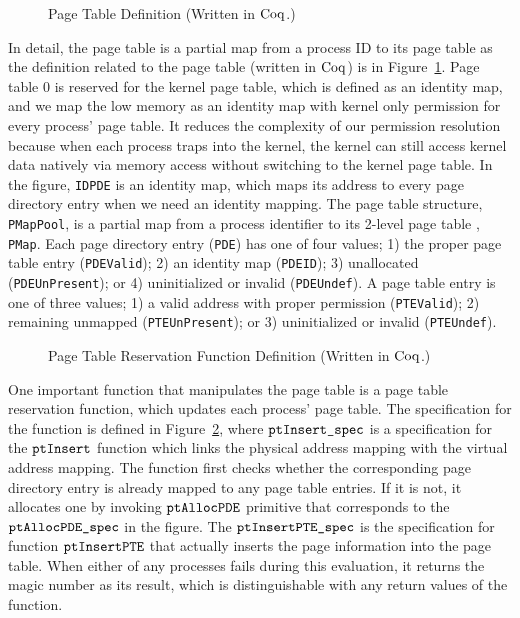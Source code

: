 \begin{figure}
 
\caption{Page Table Definition (Written in $\mathrm{Coq}$.)}
\label{fig:chapter:certikos:page-table}
\end{figure}
In detail, the page table is a partial map from a process ID to its page table as the definition related to the page table (written in $\mathrm{Coq}$) is in
Figure~\ref{fig:chapter:certikos:page-table}. 
Page table 0 is reserved for the kernel page table, which is defined as an identity map,
and we map the low memory as an identity map with kernel only permission
for every process' page table.
It reduces the complexity of our permission resolution because when each process traps into the kernel,
the kernel can still access kernel data natively via memory access
without switching to the kernel page table. 
In the figure, 
\lstinline$IDPDE$ is an identity  map, which maps its address to every page directory entry when we need an identity mapping.
The page table structure, \lstinline$PMapPool$, is a partial map from a process identifier to its 2-level page table , \lstinline$PMap$.
 Each page directory entry (\lstinline$PDE$) has one of four values;
 1) the proper page table entry (\lstinline$PDEValid$); 2) an identity map (\lstinline$PDEID$); 3) unallocated (\lstinline$PDEUnPresent$); or 4) uninitialized or invalid (\lstinline$PDEUndef$). 
A page table entry is one of three values;
1)  a valid address with proper permission (\lstinline$PTEValid$); 2) remaining unmapped (\lstinline$PTEUnPresent$);
 or 3) uninitialized or invalid (\lstinline$PTEUndef$).

 \begin{figure}
 
\caption{Page Table Reservation Function Definition (Written in $\mathrm{Coq}$.)}
\label{fig:chapter:certikos:ptresv-func}
\end{figure}
 One important function that manipulates the page table is a page table reservation function,
 which updates each process' page table.
 The specification for the function is defined in Figure~\ref{fig:chapter:certikos:ptresv-func},
  where  ${\mathrm{\texttt{ptInsert\_spec}}}$ is a specification for the ${\mathrm{\texttt{ptInsert}}}$ function which links 
the physical address mapping with the virtual address mapping. 
The function first checks whether the corresponding page directory entry is already mapped to any page table entries.
If it is not, it allocates one by invoking ${\mathrm{\texttt{ptAllocPDE}}}$ primitive that corresponds to the  ${\mathrm{\texttt{ptAllocPDE\_spec}}}$
in the figure.
The ${\mathrm{\texttt{ptInsertPTE\_spec}}}$ is the specification for function ${\mathrm{\texttt{ptInsertPTE}}}$ that actually inserts the page 
information into the page table. 
When either of any processes fails during this evaluation, it returns the magic number as its result, which is distinguishable with 
any return values of the function.

